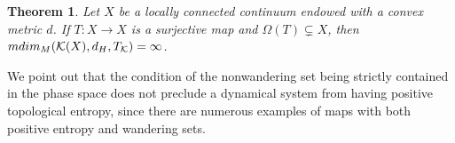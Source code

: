 \documentclass[sn-mathphys-num]{sn-jnl}%
\theoremstyle{thmstyleone}%
\newtheorem{theorem}{Theorem}%
\theoremstyle{thmstyletwo}%
\theoremstyle{thmstylethree}%
\newcommand*\induce[1]{#1_\mathcal{K}}
\newcommand*\hyp[1]{\mathcal{#1}}
\begin{document}
\begin{theorem}\label{thm:surjective-map-nonwandering-infinite-metric-mean-dim}
    Let $X$ be a locally connected continuum endowed with a convex metric $d$. If $T: X \to X$ is a surjective map and $\Omega(T) \subsetneq X$, then $\emph{mdim}_M(\hyp{K}(X), d_H, \induce{T}) = \infty$.\\
\end{theorem}

We point out that the condition of the nonwandering set being strictly contained in the phase space does not preclude a dynamical system from having positive topological entropy, since there are numerous examples of maps with both positive entropy and wandering sets.




\end{document}
